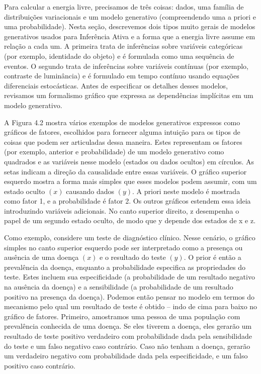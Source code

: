 \documentclass[
  12pt,
]{book}
\begin{document}
Para calcular a energia livre, precisamos de três coisas: dados, uma
família de distribuições variacionais e um modelo generativo
(compreendendo uma a priori e uma probabilidade). Nesta seção,
descrevemos dois tipos muito gerais de modelos generativos usados para
Inferência Ativa e a forma que a energia livre assume em relação a cada
um. A primeira trata de inferências sobre variáveis categóricas (por
exemplo, identidade do objeto) e é formulada como uma sequência de
eventos. O segundo trata de inferências sobre variáveis contínuas (por
exemplo, contraste de luminância) e é formulado em tempo contínuo usando
equações diferenciais estocásticas. Antes de especificar os detalhes
desses modelos, revisamos um formalismo gráfico que expressa as
dependências implícitas em um modelo generativo.

A Figura 4.2 mostra vários exemplos de modelos generativos expressos
como gráficos de fatores, escolhidos para fornecer alguma intuição para
os tipos de coisas que podem ser articuladas dessa maneira. Estes
representam os fatores (por exemplo, anterior e probabilidade) de um
modelo generativo como quadrados e as variáveis nesse modelo (estados ou
dados ocultos) em círculos. As setas indicam a direção da causalidade
entre essas variáveis. O gráfico superior esquerdo mostra a forma mais
simples que esses modelos podem assumir, com um estado oculto \((x)\)
causando dados \((y)\). A priori neste modelo é mostrada como fator 1, e a
probabilidade é fator 2. Os outros gráficos estendem essa ideia
introduzindo variáveis adicionais. No canto superior direito, z
desempenha o papel de um segundo estado oculto, de modo que y depende
dos estados de x e z.

Como exemplo, considere um teste de diagnóstico clínico. Nesse cenário,
o gráfico simples no canto superior esquerdo pode ser interpretado como
a presença ou ausência de uma doença \((x)\) e o resultado do teste \((y)\).
O prior é então a prevalência da doença, enquanto a probabilidade
especifica as propriedades do teste. Estes incluem sua especificidade (a
probabilidade de um resultado negativo na ausência da doença) e a
sensibilidade (a probabilidade de um resultado positivo na presença da
doença). Podemos então pensar no modelo em termos do mecanismo pelo qual
um resultado de teste é obtido -- indo de cima para baixo no gráfico de
fatores. Primeiro, amostramos uma pessoa de uma população com
prevalência conhecida de uma doença. Se eles tiverem a doença, eles
gerarão um resultado de teste positivo verdadeiro com probabilidade dada
pela sensibilidade do teste e um falso negativo caso contrário. Caso não
tenham a doença, gerarão um verdadeiro negativo com probabilidade dada
pela especificidade, e um falso positivo caso contrário.
\end{document}
